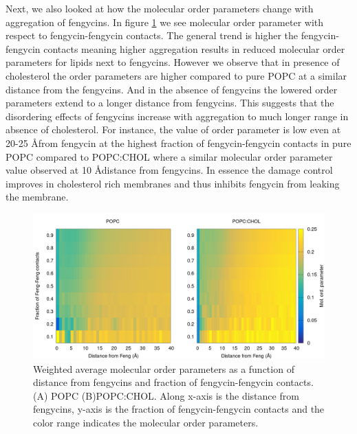 Next, we also looked at how the molecular order parameters change with aggregation 
of fengycins. In figure \ref{f:dibmop_2d} we see molecular order parameter with 
respect to fengycin-fengycin contacts. The general trend is higher the 
fengycin-fengycin contacts meaning higher aggregation results in reduced molecular 
order parameters for lipids next to fengycins.
However we observe that in presence of cholesterol the order parameters are higher compared to pure POPC at a similar distance from the fengycins. And in the absence of fengycins the lowered order parameters extend to a longer distance from fengycins.
This suggests that the disordering effects of fengycins increase with aggregation to much longer range in absence of cholesterol. For instance, the value of order parameter is low even at 20-25 \AA from fengycin at the highest fraction of fengycin-fengycin contacts in pure POPC compared to POPC:CHOL where a similar molecular order parameter value observed at 10 \AA distance from fengycins. In essence the damage control improves in cholesterol rich membranes and thus inhibits fengycin from leaking the membrane.
\begin{figure}[h!]
\centering
\includegraphics[width=6in,angle=0,keepaspectratio]{chapter3_figs/dibmop_avg_2d.png}
\caption{Weighted average molecular order parameters as a function of distance from fengycins and fraction of fengycin-fengycin contacts.(A) POPC (B)POPC:CHOL. Along x-axis is the distance from fengycins, y-axis is the fraction of fengycin-fengycin contacts and the color range indicates the molecular order parameters. }
\label{f:dibmop_2d}
\end{figure}
